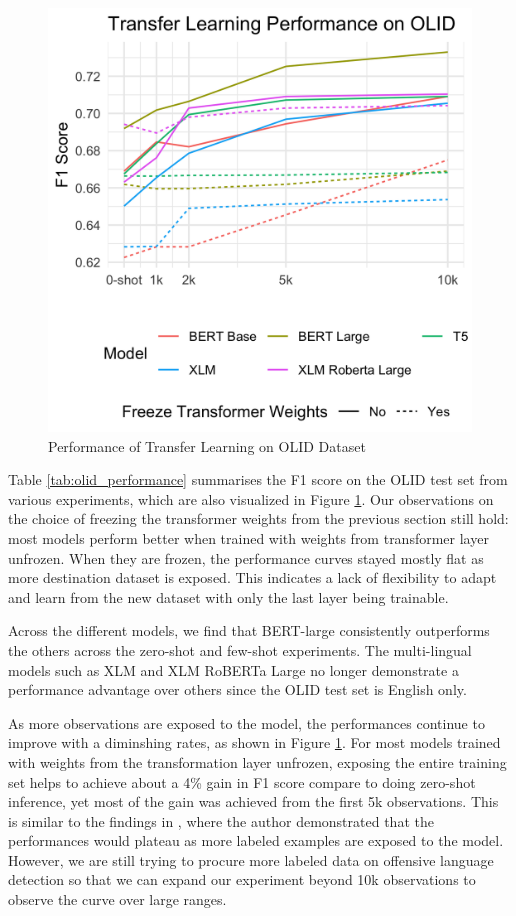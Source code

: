 \documentclass[11pt,a4paper]{article}
\begin{document}
\begin{figure}[h]
\includegraphics[width=\columnwidth]{transfer_learning_performance_nominal.png}
\centering
\caption{Performance of Transfer Learning on OLID Dataset}\label{fig:olid_performance_fig}
\end{figure}

Table \ref{tab:olid_performance} summarises the F1 score on the OLID test set from various experiments, which are also visualized in Figure \ref{fig:olid_performance_fig}. Our observations on the choice of freezing the transformer weights from the previous section still hold: most models perform better when trained with weights from transformer layer unfrozen. When they are frozen, the performance curves stayed mostly flat as more destination dataset is exposed. This indicates a lack of flexibility to adapt and learn from the new dataset with only the last layer being trainable.  

Across the different models, we find that BERT-large consistently outperforms the others across the zero-shot and few-shot experiments. The multi-lingual models such as XLM and XLM RoBERTa Large no longer demonstrate a performance advantage over others since the OLID test set is English only.

As more observations are exposed to the model, the performances continue to improve with a diminshing rates, as shown in Figure \ref{fig:olid_performance_fig}. For most models trained with weights from the transformation layer unfrozen, exposing the entire training set helps to achieve about a 4\% gain in F1 score compare to doing zero-shot inference, yet most of the gain was achieved from the first 5k observations. This is similar to the findings in \citep{cer2018universal}, where the author demonstrated that the performances would plateau as more labeled examples are exposed to the model. However, we are still trying to procure more labeled data on offensive language detection so that we can expand our experiment beyond 10k observations to observe the curve over large ranges.  
\end{document}
